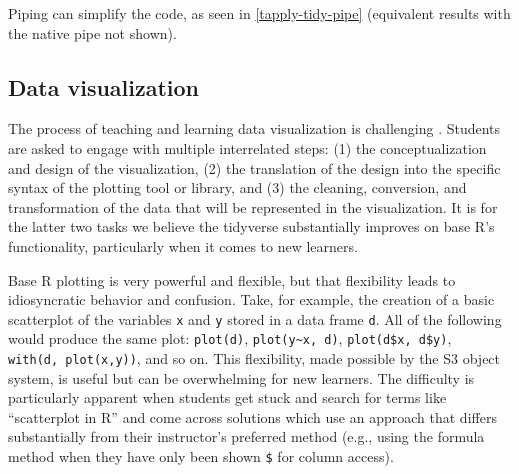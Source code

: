 \documentclass[12pt]{article}
\newenvironment{Shaded}{\begin{snugshade}}{\end{snugshade}}
\newcommand{\AttributeTok}[1]{\textcolor[rgb]{0.77,0.63,0.00}{#1}}
\newcommand{\ConstantTok}[1]{\textcolor[rgb]{0.00,0.00,0.00}{#1}}
\newcommand{\FunctionTok}[1]{\textcolor[rgb]{0.00,0.00,0.00}{#1}}
\newcommand{\NormalTok}[1]{#1}
\newcommand{\SpecialCharTok}[1]{\textcolor[rgb]{0.00,0.00,0.00}{#1}}
\begin{document}

\label{tapply-summary} \linespread{2}
\vspace{3mm}\setlength{\parindent}{15pt}

Piping can simplify the code, as seen in \ref{tapply-tidy-pipe}
(equivalent results with the native pipe not shown).

\linespread{1}

\begin{Shaded}
\end{Shaded}


\label{tapply-tidy-pipe} \linespread{2}
\vspace{3mm}\setlength{\parindent}{15pt}

\hypertarget{data-visualization}{%
\subsection{Data visualization}\label{data-visualization}}

The process of teaching and learning data visualization is challenging
\citep{nolaperr_2016}. Students are asked to engage with multiple
interrelated steps: (1) the conceptualization and design of the
visualization, (2) the translation of the design into the specific
syntax of the plotting tool or library, and (3) the cleaning,
conversion, and transformation of the data that will be represented in
the visualization. It is for the latter two tasks we believe the
tidyverse substantially improves on base R's functionality, particularly
when it comes to new learners.

Base R plotting is very powerful and flexible, but that flexibility
leads to idiosyncratic behavior and confusion. Take, for example, the
creation of a basic scatterplot of the variables \texttt{x} and
\texttt{y} stored in a data frame \texttt{d}. All of the following would
produce the same plot: \texttt{plot(d)},
\texttt{plot(y\textasciitilde{}x,\ d)}, \texttt{plot(d\$x,\ d\$y)},
\texttt{with(d,\ plot(x,y))}, and so on. This flexibility, made possible
by the S3 object system, is useful but can be overwhelming for new
learners. The difficulty is particularly apparent when students get
stuck and search for terms like ``scatterplot in R'' and come across
solutions which use an approach that differs substantially from their
instructor's preferred method (e.g., using the formula method when they
have only been shown \texttt{\$} for column access).
\end{document}
